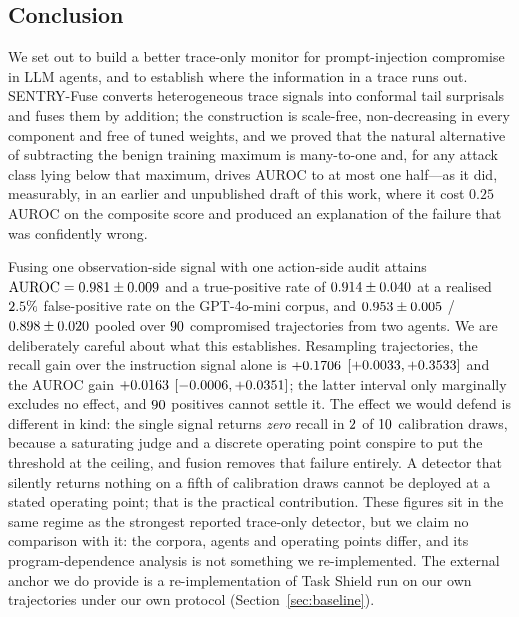 \documentclass[preprint,12pt,authoryear]{elsarticle}
\theoremstyle{definition}
\begin{document}
\subsection{Conclusion}\label{sec:conclusion}

We set out to build a better trace-only monitor for prompt-injection compromise
in LLM agents, and to establish where the information in a trace runs out.
SENTRY-Fuse converts heterogeneous trace signals into conformal tail surprisals
and fuses them by addition; the construction is scale-free, non-decreasing in
every component and free of tuned weights, and we proved that the natural
alternative of subtracting the benign training maximum is many-to-one and, for any
attack class lying below that maximum, drives AUROC to at most one half---as it
did, measurably, in an earlier and unpublished draft of this work, where it cost
$0.25$ AUROC on the composite score and produced an explanation of the failure that
was confidently wrong.

Fusing one observation-side signal with one action-side audit attains
$\mathrm{AUROC} = 0.981 \pm 0.009$ and a true-positive rate of
$0.914 \pm 0.040$ at a realised $2.5\%$ false-positive rate on
the GPT-4o-mini corpus, and $0.953 \pm 0.005$ /
$0.898 \pm 0.020$ pooled over $90$ compromised trajectories from
two agents. We are deliberately careful about what this establishes. Resampling
trajectories, the recall gain over the instruction signal alone is $+0.1706$
$[+0.0033, +0.3533]$ and the AUROC gain $+0.0163$
$[-0.0006, +0.0351]$; the latter interval only marginally excludes
no effect, and $90$ positives cannot settle it. The effect we would defend is
different in kind: the single signal returns \emph{zero} recall in
$2$ of $10$ calibration draws, because a saturating judge and a
discrete operating point conspire to put the threshold at the ceiling, and fusion
removes that failure entirely. A detector that silently returns nothing on a fifth
of calibration draws cannot be deployed at a stated operating point; that is the
practical contribution. These figures sit in the same regime as the strongest
reported trace-only detector, but we claim no comparison with it: the corpora,
agents and operating points differ, and its program-dependence analysis is not
something we re-implemented. The external anchor we do provide is a
re-implementation of Task Shield run on our own trajectories under our own
protocol (Section~\ref{sec:baseline}).
\end{document}
